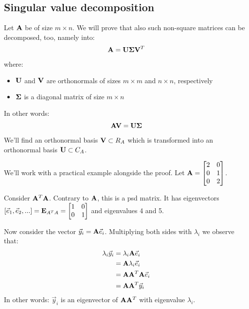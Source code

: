 \subsection{Singular value decomposition}
Let $\mathbf{A}$ be of size $m \times n$. We will prove that also such non-square matrices can be decomposed, too, namely into:
\begin{equation}
    \mathbf{A} = \mathbf{U} \mathbf{\Sigma} \mathbf{V}^T
\end{equation}
where:
\begin{itemize}
    \item $\mathbf{U}$ and $\mathbf{V}$ are orthonormals of sizes $m \times m$ and $n \times n$, respectively
    \item $\mathbf{\Sigma}$ is a diagonal matrix of size $m \times n$
\end{itemize}
In other words: 
\begin{equation}
    \mathbf{A} \mathbf{V} = \mathbf{U} \mathbf{\Sigma}
\end{equation}
We'll find an orthonormal basis $\mathbf{V} \subset R_A$ which is transformed into an orthonormal basis $\mathbf{U} \subset C_A$.


We'll work with a practical example alongside the proof. Let $\mathbf{A} = \begin{bmatrix}
  2 & 0 \\
  0 & 1 \\
  0 & 2   
\end{bmatrix}$.

Consider $\mathbf{A}^T \mathbf{A}$. Contrary to $\mathbf{A}$, this is a psd matrix. It has eigenvectors $[\vec{e}_1, \vec{e}_2, ...] = \mathbf{E}_{A^TA} = \begin{bmatrix}
    1 & 0 \\
    0 & 1
\end{bmatrix}$ and eigenvalues 4 and 5.

Now consider the vector $\vec{y}_i = \mathbf{A} \vec{e}_i$. Multiplying both sides with $\lambda_i$ we observe that:
\begin{equation}
    \begin{aligned}
        \lambda_i \vec{y}_i &= \lambda_i \mathbf{A} \vec{e}_i \\
                            &= \mathbf{A} \lambda_i \vec{e}_i \\
                            &= \mathbf{A} \mathbf{A}^T \mathbf{A} \vec{e}_i \\
                            &= \mathbf{A} \mathbf{A}^T \vec{y}_i
    \end{aligned}
\end{equation}
In other words: $\vec{y}_i$ is an eigenvector of $\mathbf{A} \mathbf{A}^T$ with eigenvalue $\lambda_i$.

